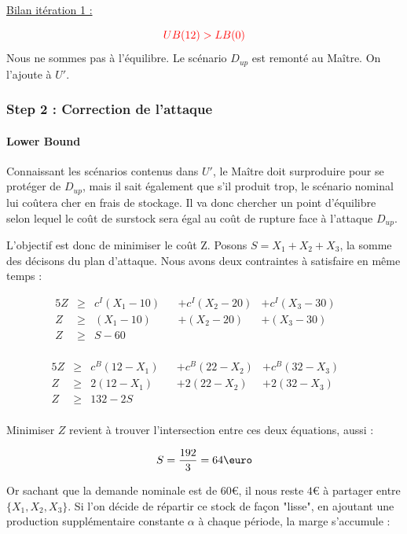 \documentclass[11pt,a4paper]{article}
\begin{document}
\underline{Bilan itération 1 :}

\[
    \textcolor{red}{UB(12)>LB(0)}
\]
Nous ne sommes pas à l'équilibre. Le scénario $D_{up}$ est remonté au Maître. On l'ajoute à $U'$.


\subsubsection{Step 2 : Correction de l'attaque}

\paragraph{Lower Bound} Connaissant les scénarios contenus dans $U'$, le Maître doit surproduire pour se protéger de $D_{up}$, mais il sait également que s'il produit trop, le scénario nominal lui coûtera cher en frais de stockage. Il va donc chercher un point d'équilibre selon lequel le coût de surstock sera égal au coût de rupture face à l'attaque $D_{up}$.

L'objectif est donc de minimiser le coût Z. Posons $S=X_1 + X_2 + X_3$, la somme des décisons du plan d'attaque. Nous avons deux contraintes à satisfaire en même temps :

\begin{alignat}{5}
   Z& \geq{}&  c^I(X_1-10)&& + c^I(X_2-20)& + c^I(X_3-30)&&\\
   Z& \geq{}& (X_1-10)&& + (X_2-20)& + (X_3-30)&&\\
   Z& \geq{}& S-60&&\\
\end{alignat}
    
\begin{alignat}{5}
   Z& \geq{}&  c^B(12 - X_1)&& + c^B(22 - X_2)& + c^B(32 - X_3)&&\\
   Z& \geq{}& 2(12 - X_1)&& + 2(22 - X_2)& + 2(32 - X_3)&&\\
   Z& \geq{}& 132-2S&&\\
\end{alignat}

Minimiser $Z$ revient à trouver l'intersection entre ces deux équations, aussi :

\[
    S=\frac{192}{3}=64\text{\euro}
\]

Or sachant que la demande nominale est de $60$\euro, il nous reste $4$\euro{} à partager entre $\{X_1, X_2, X_3\}$.
Si l'on décide de répartir ce stock de façon "lisse", en ajoutant une production supplémentaire constante $\alpha$ à chaque période, la marge s'accumule :
\end{document}
